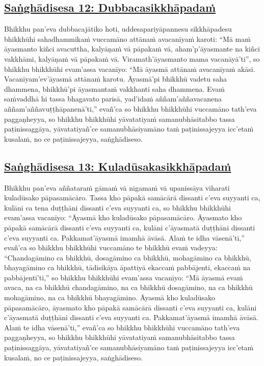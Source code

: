 \subsection*{\hyperref[comm12]{Saṅghādisesa 12: Dubbacasikkhāpadaṁ}}
\label{sd12}

Bhikkhu pan'eva dubbacajātiko hoti, uddesapariyāpannesu sikkhāpadesu bhikkhūhi sahadhammikaṁ vuccamāno attānaṁ avacanīyaṁ karoti: ``Mā maṁ āyasmanto kiñci avacuttha, kalyāṇaṁ vā pāpakaṁ vā, aham'p'āyasmante na kiñci vakkhāmi, kalyāṇaṁ vā pāpakaṁ vā. Viramath'āyasmanto mama vacanāyā'ti'', so bhikkhu bhikkhūhi evam'assa vacanīyo: ``Mā āyasmā attānaṁ avacanīyaṁ akāsi. Vacanīyam'ev'āyasmā attānaṁ karotu. Āyasmā'pi bhikkhū vadetu saha dhammena, bhikkhū'pi āyasmantaṁ vakkhanti saha dhammena. Evaṁ saṁvaddhā hi tassa bhagavato parisā, yad'idaṁ aññam'aññavacanena aññam'aññavuṭṭhāpanenā'ti,'' evañ'ca so bhikkhu bhikkhūhi vuccamāno tath'eva paggaṇheyya, so bhikkhu bhikkhūhi yāvatatiyaṁ samanubhāsitabbo tassa paṭinissaggāya, yāvatatiyañ'ce samanubhāsiyamāno taṁ paṭinissajeyya icc'etaṁ kusalaṁ, no ce paṭinissajeyya, saṅghādiseso.



\subsection*{\hyperref[comm13]{Saṅghādisesa 13: Kuladūsakasikkhāpadaṁ}}
\label{sd13}

Bhikkhu pan'eva aññataraṁ gāmaṁ vā nigamaṁ vā upanissāya viharati kuladūsako pāpasamācāro. Tassa kho pāpakā samācārā dissanti c'eva suyyanti ca, kulāni ca tena duṭṭhāni dissanti c'eva suyyanti ca, so bhikkhu bhikkhūhi evam'assa vacanīyo: ``Āyasmā kho kuladūsako pāpasamācāro. Āyasmato kho pāpakā samācārā dissanti c'eva suyyanti ca, kulāni c'āyasmatā duṭṭhāni dissanti c'eva suyyanti ca. Pakkamat'āyasmā imamhā āvāsā. Alaṁ te idha vāsenā'ti,'' evañ'ca so bhikkhu bhikkhūhi vuccamāno te bhikkhū evaṁ vadeyya: ``Chandagāmino ca bhikkhū, dosagāmino ca bhikkhū, mohagāmino ca bhikkhū, bhayagāmino ca bhikkhū, tādisikāya āpattiyā ekaccaṁ pabbājenti, ekaccaṁ na pabbājentī'ti,'' so bhikkhu bhikkhūhi evam'assa vacanīyo: ``Mā āyasmā evaṁ avaca, na ca bhikkhū chandagāmino, na ca bhikkhū dosagāmino, na ca bhikkhū mohagāmino, na ca bhikkhū bhayagāmino. Āyasmā kho kuladūsako pāpasamācāro, āyasmato kho pāpakā samācārā dissanti c'eva suyyanti ca, kulāni c'āyasmatā duṭṭhāni dissanti c'eva suyyanti ca. Pakkamat'āyasmā imamhā āvāsā. Alaṁ te idha vāsenā'ti,'' evañ'ca so bhikkhu bhikkhūhi vuccamāno tath'eva paggaṇheyya, so bhikkhu bhikkhūhi yāvatatiyaṁ samanubhāsitabbo tassa paṭinissaggāya, yāvatatiyañ'ce samanubhāsiyamāno taṁ paṭinissajeyya icc'etaṁ kusalaṁ, no ce paṭinissajeyya, saṅghādiseso.



